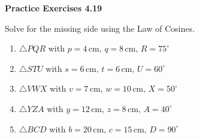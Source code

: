 \vspace{0.3ex}
\noindent\textbf{Practice Exercises 4.19}

\vspace{0.2ex}

Solve for the missing side using the Law of Cosines.

\begin{enumerate}
    \item \(\triangle PQR\) with \(p = 4 \, \text{cm}, \, q = 8 \, \text{cm}, \, R = 75^\circ\)
    \item \(\triangle STU\) with \(s = 6 \, \text{cm}, \, t = 6 \, \text{cm}, \, U = 60^\circ\)
    \item \(\triangle VWX\) with \(v = 7 \, \text{cm}, \, w = 10 \, \text{cm}, \, X = 50^\circ\)
    \item \(\triangle YZA\) with \(y = 12 \, \text{cm}, \, z = 8 \, \text{cm}, \, A = 40^\circ\)
    \item \(\triangle BCD\) with \(b = 20 \, \text{cm}, \, c = 15 \, \text{cm}, \, D = 90^\circ\)
\end{enumerate}
